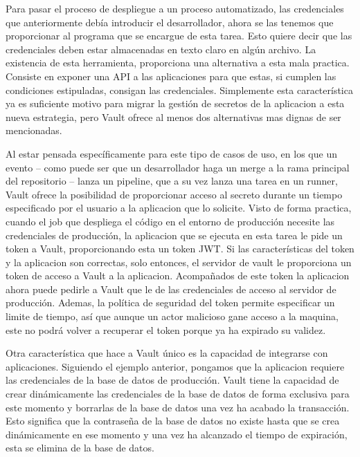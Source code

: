 \documentclass[12pt]{report} %
\begin{document}
Para pasar el proceso de despliegue a un proceso automatizado, las credenciales
que anteriormente debía introducir el desarrollador, ahora se las tenemos que
proporcionar al programa que se encargue de esta tarea.
Esto quiere decir que las credenciales deben estar almacenadas en texto claro en
algún archivo.
La existencia de esta herramienta, proporciona una alternativa a esta mala
practica.
Consiste en exponer una API a las aplicaciones para que estas, si cumplen las
condiciones estipuladas, consigan las credenciales.
Simplemente esta característica ya es suficiente motivo para migrar la gestión
de secretos de la aplicacion a esta nueva estrategia, pero Vault ofrece al menos
dos alternativas mas dignas de ser mencionadas.

Al estar pensada específicamente para este tipo de casos de uso, en los que un
evento -- como puede ser que un desarrollador haga un \gls{merge} a la rama
principal del repositorio -- lanza un \gls{pipeline}, que a su vez lanza una
tarea en un \gls{runner}, Vault ofrece la posibilidad de proporcionar acceso al
secreto durante un tiempo especificado por el usuario a la aplicacion que lo
solicite.
Visto de forma practica, cuando el job que despliega el código en el entorno de
producción necesite las credenciales de producción, la aplicacion que se ejecuta
en esta tarea le pide un token a Vault, proporcionando esta un token \gls{JWT}.
Si las características del token y la aplicacion son correctas, solo entonces,
el servidor de vault le proporciona un token de acceso a Vault a la aplicacion.
Acompañados de este token la aplicacion ahora puede pedirle a
Vault que le de las credenciales de acceso al servidor de producción.
Ademas, la política de seguridad del token permite especificar un limite de
tiempo, así que aunque un actor malicioso gane acceso a la maquina, este no podrá
volver a recuperar el token porque ya ha expirado su validez.

Otra característica que hace a Vault único es la capacidad de integrarse con
aplicaciones.
Siguiendo el ejemplo anterior, pongamos que la aplicacion requiere las
credenciales de la base de datos de producción.
Vault tiene la capacidad de crear dinámicamente las credenciales de la base de
datos de forma exclusiva para este momento y borrarlas de la base de datos una
vez ha acabado la transacción.
Esto significa que la contraseña de la base de datos no existe hasta que se crea
dinámicamente en ese momento y una vez ha alcanzado el tiempo de expiración,
esta se elimina de la base de datos.
\end{document}
